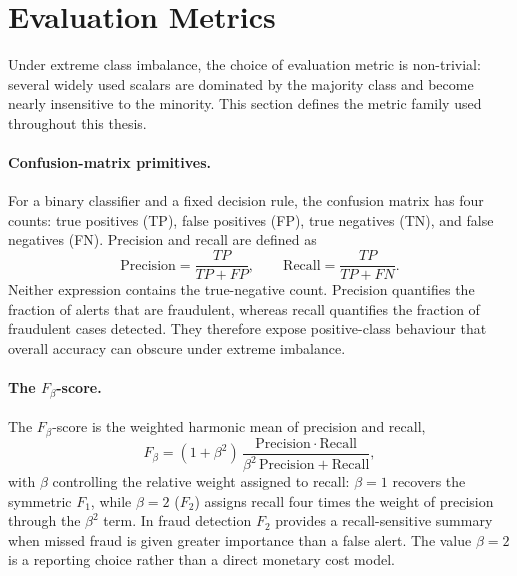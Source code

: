 \section{Evaluation Metrics}
\label{sec:tb:metrics}

Under extreme class imbalance, the choice of evaluation metric is non-trivial:
several widely used scalars are dominated by the majority class and become
nearly insensitive to the minority. This section defines the metric family
used throughout this thesis.

\paragraph{Confusion-matrix primitives.}
For a binary classifier and a fixed decision rule, the confusion matrix has
four counts: true positives (TP), false positives (FP), true negatives (TN),
and false negatives (FN). Precision and recall are defined as
\[
\mathrm{Precision} = \frac{TP}{TP + FP}, \qquad
\mathrm{Recall} = \frac{TP}{TP + FN}.
\]
Neither expression contains the true-negative count. Precision quantifies the
fraction of alerts that are fraudulent, whereas recall quantifies the fraction
of fraudulent cases detected. They therefore expose positive-class behaviour
that overall accuracy can obscure under extreme imbalance.

\paragraph{The $F_{\beta}$-score.}
The $F_{\beta}$-score is the weighted harmonic mean of precision and recall,
\[
F_{\beta} = (1+\beta^{2})\,\frac{\mathrm{Precision}\cdot\mathrm{Recall}}
                                 {\beta^{2}\,\mathrm{Precision} + \mathrm{Recall}},
\]
with $\beta$ controlling the relative weight assigned to recall: $\beta{=}1$
recovers the symmetric $F_1$, while $\beta{=}2$ ($F_2$) assigns recall four
times the weight of precision through the $\beta^2$ term. In fraud
detection $F_2$ provides a recall-sensitive summary when missed fraud is given
greater importance than a false alert. The value $\beta{=}2$ is a reporting
choice rather than a direct monetary cost model.

